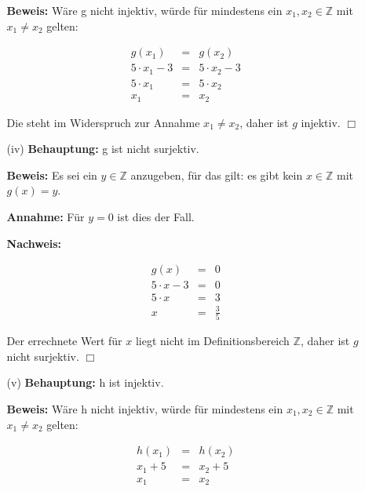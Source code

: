 \documentclass[a4paper]{scrartcl}
\begin{document}
\begin{enumerate}
\begin{enumerate}
                \textbf{Beweis:} Wäre g nicht injektiv, würde für mindestens ein $x_1, x_2 \in \mathbb{Z}$ mit $x_1 \not= x_2$ gelten:
                
                $$\begin{array}{rcl}
                   g(x_1) &=& g(x_2)\\
                   5 \cdot x_1 - 3 &=& 5 \cdot x_2 - 3\\
                   5 \cdot x_1 &=& 5 \cdot x_2\\
                   x_1 &=& x_2
                \end{array}$$
                
                Die steht im Widerspruch zur Annahme $x_1 \not= x_2$, daher ist $g$ injektiv. $\Box$
                
            \item[(iv)]
                \textbf{Behauptung:} g ist nicht surjektiv.

                \textbf{Beweis:} Es sei ein $y \in \mathbb{Z}$ anzugeben, für das gilt: es gibt kein $x \in \mathbb{Z}$ mit
                $g(x) = y$.
                
                \textbf{Annahme:} Für $y = 0$ ist dies der Fall.
                
                \textbf{Nachweis:}
                
                $$\begin{array}{rcl}
                    g(x) &=& 0\\
                    5 \cdot x - 3 &=& 0\\
                    5 \cdot x &=& 3\\
                    x &=& \frac{3}{5}
                \end{array}$$
                
                Der errechnete Wert für $x$ liegt nicht im Definitionsbereich $\mathbb{Z}$, daher ist $g$ nicht surjektiv. $\Box$
            
            \item[(v)]
                \textbf{Behauptung:} h ist injektiv.
                
                \textbf{Beweis:} Wäre h nicht injektiv, würde für mindestens ein $x_1, x_2 \in \mathbb{Z}$ mit $x_1 \not= x_2$ gelten:
                
                $$\begin{array}{rcl}
                   h(x_1) &=& h(x_2)\\
                   x_1 + 5 &=& x_2 + 5\\
                   x_1 &=& x_2
                \end{array}$$
                

\end{enumerate}
\end{enumerate}
\end{document}
